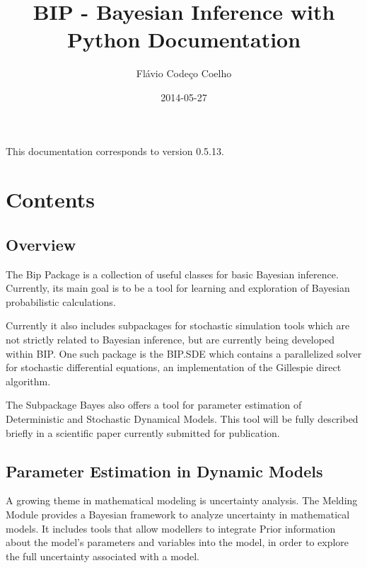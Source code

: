 \documentclass[a4paper,10pt,english]{sphinxmanual}
\title{BIP - Bayesian Inference with Python Documentation}
\date{2014-05-27}
\author{Flávio Codeço Coelho}
\begin{document}
\maketitle
\tableofcontents
{}\label{index::doc}


This documentation corresponds to version 0.5.13.


\chapter{Contents}
\label{index:contents}\label{index:welcome-to-bip-bayesian-inference-with-python-s-documentation}

\section{Overview}
\label{overview:overview}\label{overview::doc}
The Bip Package is a collection of useful classes for basic Bayesian inference. Currently, its main goal is to be a tool for learning and exploration of Bayesian probabilistic calculations.

Currently it also includes subpackages for stochastic simulation tools which are not strictly related to Bayesian inference, but are currently being developed within BIP. One such package is the BIP.SDE which contains a parallelized solver for stochastic differential equations, an implementation of the Gillespie direct algorithm.

The Subpackage Bayes also offers a tool for parameter estimation of Deterministic and Stochastic Dynamical Models. This tool will be fully described briefly in a scientific paper currently submitted for publication.


\section{Parameter Estimation in Dynamic Models}
\label{paramest:parameter-estimation-in-dynamic-models}\label{paramest::doc}
A growing theme in mathematical modeling is uncertainty analysis. The Melding Module provides a Bayesian framework to analyze uncertainty in mathematical models. It includes tools that allow modellers to integrate Prior information about the model's parameters and variables into the model, in order to explore the full uncertainty associated with a model.
\end{document}
